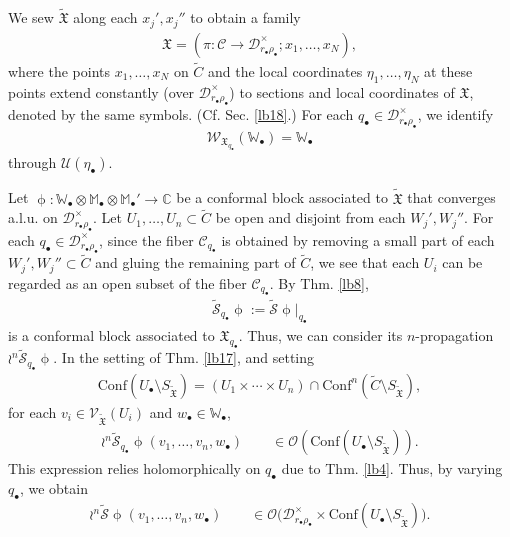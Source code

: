 \documentclass[12pt,a4paper,notitlepage]{article}
\theoremstyle{definition}
\theoremstyle{plain}
\newcommand{\fk}{\mathfrak}
\newcommand{\mc}{\mathcal}
\newcommand{\wtd}{\widetilde}
\newcommand{\Conf}{\mathrm{Conf}}
\newcommand{\scr}{\mathscr}
\newcommand{\blt}{\bullet}
\newcommand{\Wbb}{\mathbb W}
\newcommand{\Mbb}{\mathbb M}
\newcommand{\Cbb}{\mathbb C}
\newcommand{\SXtd}{S_{\wtd{\fk X}}}
\numberwithin{equation}{section}
\begin{document}
We sew $\wtd{\fk X}$ along each $x_j',x_j''$ to obtain a family
\begin{align*}
\fk X=(\pi:\mc C\rightarrow\mc D_{r_\blt\rho_\blt}^\times;x_1,\dots,x_N),	
\end{align*}
where the points $x_1,\dots,x_N$  on $\wtd C$  and the local coordinates $\eta_1,\dots,\eta_N$ at these points extend constantly (over $\mc D_{r_\blt\rho_\blt}^\times$) to sections and local coordinates of $\fk X$, denoted by the same symbols. (Cf. Sec. \ref{lb18}.) For each $q_\blt\in\mc D_{r_\blt\rho_\blt}^\times$, we identify
\begin{align*}
\scr W_{\fk X_{q_\blt}}(\Wbb_\blt)=\Wbb_\blt
\end{align*}
through $\mc U(\eta_\blt)$.

Let $\upphi:\Wbb_\blt\otimes\Mbb_\blt\otimes\Mbb_\blt'\rightarrow\Cbb$ be a conformal block associated to $\wtd{\fk X}$ that converges a.l.u. on $\mc D_{r_\blt\rho_\blt}^\times$. Let $U_1,\dots,U_n\subset \wtd C$ be open and disjoint from each $W_j',W_j''$. For each $q_\blt\in\mc D_{r_\blt\rho_\blt}^\times$, since the fiber $\mc C_{q_\blt}$ is obtained by removing a small part of each $W_j',W_j''\subset\wtd C$ and gluing the remaining part of $\wtd C$, we see that each $U_i$ can be regarded as an open subset of the fiber $\mc C_{q_\blt}$. By Thm. \ref{lb8},  \index{S@$\wtd{\mc S}_{q_\blt}\upphi$} 
\begin{align*}
\wtd{\mc S}_{q_\blt}\upphi:=\wtd{\mc S}\upphi|_{q_\blt}	
\end{align*}
is a conformal block associated to $\fk X_{q_\blt}$. Thus, we can consider its $n$-propagation $\wr^n\wtd{\mc S}_{q_\blt}\upphi$.  In the setting of Thm. \ref{lb17}, and setting
\begin{align*}
\Conf(U_\blt\setminus\SXtd)=(U_1\times\cdots\times U_n)\cap\Conf^n(\wtd C\setminus\SXtd),	
\end{align*}
for each $v_i\in\scr V_{\wtd{\fk X}}(U_i)$ and $w_\blt\in\Wbb_\blt$,
\begin{align*}
\wr^n\wtd{\mc S}_{q_\blt}\upphi(v_1,\dots,v_n,w_\blt)\qquad\in\scr O(\Conf(U_\blt\setminus\SXtd)).
\end{align*}
This expression relies holomorphically on $q_\blt$ due to  Thm. \ref{lb4}. Thus, by varying $q_\blt$, we obtain
\begin{align}
\wr^n\wtd{\mc S}\upphi(v_1,\dots,v_n,w_\blt)\qquad\in\scr O\big(\mc D_{r_\blt\rho_\blt}^\times\times\Conf(U_\blt\setminus\SXtd)\big).	\label{eq37}
\end{align}
\end{document}
